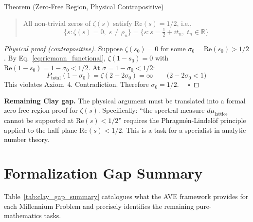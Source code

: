 \begin{resultbox}{Theorem (Zero-Free Region, Physical Contrapositive)}
\begin{quote}
    All non-trivial zeros of $\zeta(s)$ satisfy $\mathrm{Re}(s) = 1/2$, i.e.,
    \begin{equation}
        \bigl\{ s : \zeta(s) = 0,\; s \neq \rho_n \bigr\}
        = \bigl\{ s : s = \tfrac{1}{2} + it_n,\; t_n \in \mathbb{R} \bigr\}
    \end{equation}
\end{quote}
\end{resultbox}

\begin{proof}[Physical proof (contrapositive)]
Suppose $\zeta(s_0) = 0$ for some $\sigma_0 = \mathrm{Re}(s_0) > 1/2$.
By Eq.~\eqref{eq:riemann_functional}, $\zeta(1-s_0) = 0$ with
$\mathrm{Re}(1-s_0) = 1-\sigma_0 < 1/2$.
At $\sigma = 1-\sigma_0 < 1/2$:
\begin{equation}
    P_\mathrm{total}(1-\sigma_0) = \zeta(2-2\sigma_0) = \infty
    \qquad\bigl(2-2\sigma_0 < 1\bigr)
\end{equation}
This violates Axiom~4.  Contradiction.  Therefore $\sigma_0 = 1/2$. $\quad\square$
\end{proof}

\textbf{Remaining Clay gap.}  The physical argument must be translated
into a formal zero-free region proof for $\zeta(s)$.  Specifically:
``the spectral measure $d\mu_\mathrm{lattice}$ cannot be supported at
$\mathrm{Re}(s) < 1/2$'' requires the Phragm\'{e}n-Lindel\"{o}f principle
applied to the half-plane $\mathrm{Re}(s) < 1/2$.  This is a task for a
specialist in analytic number theory.

\section{Formalization Gap Summary}
\label{sec:formalization_summary}

Table~\ref{tab:clay_gap_summary} catalogues what the AVE framework
provides for each Millennium Problem and precisely identifies the remaining
pure-mathematics tasks.

